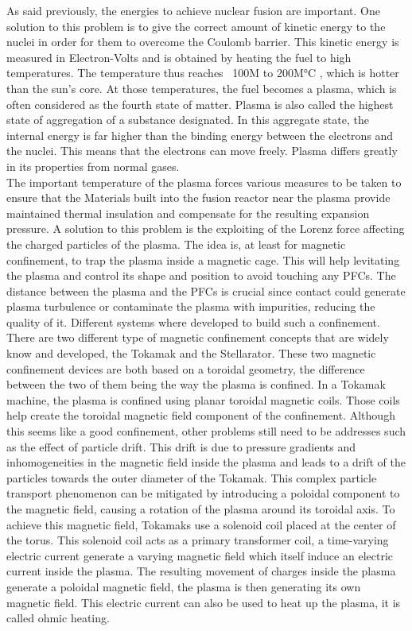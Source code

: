 \normalsize{\indent As said previously, the energies to achieve nuclear fusion are important. One solution to this problem is to give the correct amount of kinetic energy to the nuclei in order for them to overcome the Coulomb barrier. This kinetic energy is measured in Electron-Volts and is obtained by heating the fuel to high temperatures. The temperature thus reaches ~100M to 200M°C \cite{diekmann_energie:_2014}, which is hotter than the sun’s core. At those temperatures, the fuel becomes a plasma, which is often considered as the fourth state of matter. Plasma is also called the highest state of aggregation of a substance designated. In this aggregate state, the internal energy is far higher than the binding energy between the electrons and the nuclei. This means that the electrons can move freely. Plasma differs greatly in its properties from normal gases.}
\\
\break
\normalsize{\indent The important temperature of the plasma forces various measures to be taken to ensure that the Materials built into the fusion reactor near the plasma provide maintained thermal insulation and compensate for the resulting expansion pressure. A solution to this problem is the exploiting of the Lorenz force affecting the charged particles of the plasma. The idea is, at least for magnetic confinement, to trap the plasma inside a magnetic cage. This will help levitating the plasma and control its shape and position to avoid touching any \acrshort{PFCs}. The distance between the plasma and the \acrshort{PFCs} is crucial since contact could generate plasma turbulence or contaminate the plasma with impurities, reducing the quality of it. Different systems where developed to build such a confinement. }
\\
\break
\normalsize{\indent There are two different type of magnetic confinement concepts that are widely know and developed, the Tokamak and the Stellarator. These two magnetic confinement devices are both based on a toroidal geometry, the difference between the two of them being the way the plasma is confined. In a Tokamak machine, the plasma is confined using planar toroidal magnetic coils. Those coils help create the toroidal magnetic field component of the confinement. Although this seems like a good confinement, other problems still need to be addresses such as the effect of particle drift. This drift is due to  pressure gradients and inhomogeneities in the magnetic field inside the plasma and leads to a drift of the particles towards the outer diameter of the Tokamak. This complex particle transport phenomenon can be mitigated by introducing a poloidal component to the magnetic field, causing a rotation of the plasma around its toroidal axis. To achieve this magnetic field, Tokamaks use a solenoid coil placed at the center of the torus. This solenoid coil acts as a primary transformer coil, a time-varying electric current generate a varying magnetic field which itself induce an electric current inside the plasma. The resulting movement of charges inside the plasma generate a poloidal magnetic field, the plasma is then generating its own magnetic field. This electric current can also be used to heat up the plasma, it is called ohmic heating.}
